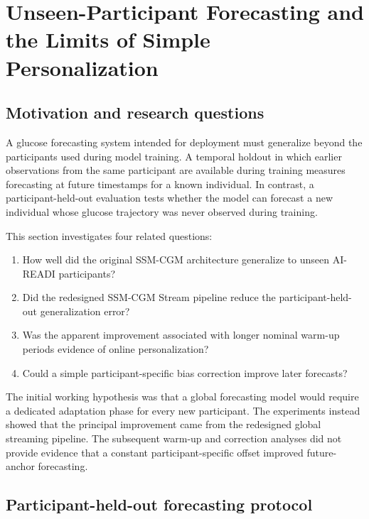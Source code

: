 \section{Unseen-Participant Forecasting and the Limits of Simple Personalization}
\label{sec:forecasting_personalization}

\subsection{Motivation and research questions}

A glucose forecasting system intended for deployment must generalize beyond the
participants used during model training. A temporal holdout in which earlier
observations from the same participant are available during training measures
forecasting at future timestamps for a known individual. In contrast, a
participant-held-out evaluation tests whether the model can forecast a new
individual whose glucose trajectory was never observed during training.

This section investigates four related questions:

\begin{enumerate}
    \item How well did the original SSM-CGM architecture generalize to unseen
    AI-READI participants?
    \item Did the redesigned SSM-CGM Stream pipeline reduce the
    participant-held-out generalization error?
    \item Was the apparent improvement associated with longer nominal warm-up
    periods evidence of online personalization?
    \item Could a simple participant-specific bias correction improve later
    forecasts?
\end{enumerate}

The initial working hypothesis was that a global forecasting model would
require a dedicated adaptation phase for every new participant. The experiments
instead showed that the principal improvement came from the redesigned global
streaming pipeline. The subsequent warm-up and correction analyses did not
provide evidence that a constant participant-specific offset improved
future-anchor forecasting.

\subsection{Participant-held-out forecasting protocol}
\label{subsec:participant_held_out_protocol}

